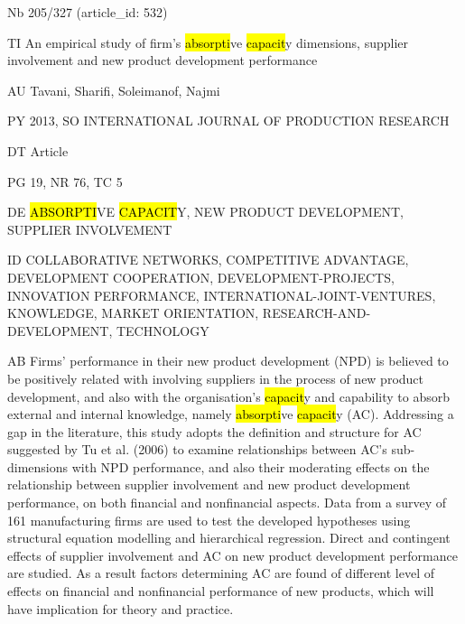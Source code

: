 \documentclass[a4paper]{article}
\begin{document}
\vspace*{-2cm}
Nb \tabto{0cm}205/327 (article\_id: 532)\par
TI \tabto{0cm}An empirical study of firm's \hl{absorpti}ve \hl{capacit}y dimensions, supplier involvement and new product development performance\par
AU \tabto{0cm}Tavani, Sharifi, Soleimanof, Najmi\par
PY \tabto{0cm}2013, SO INTERNATIONAL JOURNAL OF PRODUCTION RESEARCH\par
DT \tabto{0cm}Article\par
PG \tabto{0cm}19, NR 76, TC 5\par
DE \tabto{0cm}\hl{ABSORPTI}VE \hl{CAPACIT}Y, NEW PRODUCT DEVELOPMENT, SUPPLIER INVOLVEMENT\par
ID \tabto{0cm}COLLABORATIVE NETWORKS, COMPETITIVE ADVANTAGE, DEVELOPMENT COOPERATION, DEVELOPMENT-PROJECTS, INNOVATION PERFORMANCE, INTERNATIONAL-JOINT-VENTURES, KNOWLEDGE, MARKET ORIENTATION, RESEARCH-AND-DEVELOPMENT, TECHNOLOGY\par
AB \tabto{0cm}Firms' performance in their new product development (NPD) is believed to be positively related with involving suppliers in the process of new product development, and also with the organisation's \hl{capacit}y and capability to absorb external and internal knowledge, namely \hl{absorpti}ve \hl{capacit}y (AC). Addressing a gap in the literature, this study adopts the definition and structure for AC suggested by Tu et al. (2006) to examine relationships between AC's sub-dimensions with NPD performance, and also their moderating effects on the relationship between supplier involvement and new product development performance, on both financial and nonfinancial aspects. Data from a survey of 161 manufacturing firms are used to test the developed hypotheses using structural equation modelling and hierarchical regression. Direct and contingent effects of supplier involvement and AC on new product development performance are studied. As a result factors determining AC are found of different level of effects on financial and nonfinancial performance of new products, which will have implication for theory and practice.\par
\clearpage
\end{document}
